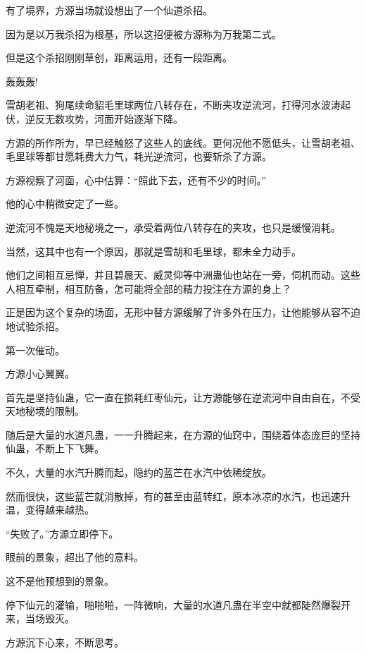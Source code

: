 
\begin{this_body}



有了境界，方源当场就设想出了一个仙道杀招。

因为是以万我杀招为根基，所以这招便被方源称为万我第二式。

但是这个杀招刚刚草创，距离运用，还有一段距离。

轰轰轰!

雪胡老祖、狗尾续命貂毛里球两位八转存在，不断夹攻逆流河，打得河水波涛起伏，逆反无数攻势，河面开始逐渐下降。

方源的所作所为，早已经触怒了这些人的底线。更何况他不愿低头，让雪胡老祖、毛里球等都甘愿耗费大力气，耗光逆流河，也要斩杀了方源。

方源视察了河面，心中估算：“照此下去，还有不少的时间。”

他的心中稍微安定了一些。

逆流河不愧是天地秘境之一，承受着两位八转存在的夹攻，也只是缓慢消耗。

当然，这其中也有一个原因，那就是雪胡和毛里球，都未全力动手。

他们之间相互忌惮，并且碧晨天、威灵仰等中洲蛊仙也站在一旁，伺机而动。这些人相互牵制，相互防备，怎可能将全部的精力投注在方源的身上？

正是因为这个复杂的场面，无形中替方源缓解了许多外在压力，让他能够从容不迫地试验杀招。

第一次催动。

方源小心翼翼。

首先是坚持仙蛊，它一直在损耗红枣仙元，让方源能够在逆流河中自由自在，不受天地秘境的限制。

随后是大量的水道凡蛊，一一升腾起来，在方源的仙窍中，围绕着体态庞巨的坚持仙蛊，不断上下飞舞。

不久，大量的水汽升腾而起，隐约的蓝芒在水汽中依稀绽放。

然而很快，这些蓝芒就消散掉，有的甚至由蓝转红，原本冰凉的水汽，也迅速升温，变得越来越热。

“失败了。”方源立即停下。

眼前的景象，超出了他的意料。

这不是他预想到的景象。

停下仙元的灌输，啪啪啪，一阵微响，大量的水道凡蛊在半空中就都陡然爆裂开来，当场毁灭。

方源沉下心来，不断思考。


\end{this_body}
